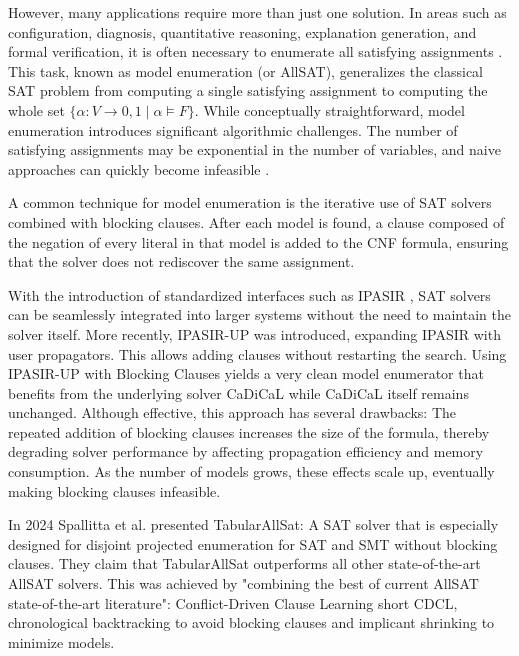 \documentclass[12pt,a4paper]{article}
\begin{document}
However, many applications require more than just one solution. In areas such as configuration, diagnosis, quantitative reasoning, explanation generation, and formal verification, it is often necessary to enumerate all satisfying assignments \cite{7113113} \cite{inproceedings} \cite{biere2021satisfiability} \cite{fried_et_al:LIPIcs.SAT.2023.9}. This task, known as model enumeration (or AllSAT), generalizes the classical SAT problem from computing a single satisfying assignment to computing the whole set \(\{\alpha : V \to {0,1} \mid \alpha \models F\}\). While conceptually straightforward, model enumeration introduces significant algorithmic challenges. The number of satisfying assignments may be exponential in the number of variables, and naive approaches can quickly become infeasible \cite{Spallitta_Sebastiani_Biere_2024}.

A common technique for model enumeration is the iterative use of SAT solvers combined with blocking clauses. After each model is found, a clause composed of the negation of every literal in that model is added to the CNF formula, ensuring that the solver does not rediscover the same assignment.

With the introduction of standardized interfaces such as IPASIR \cite{BALYO201645}, SAT solvers can be seamlessly integrated into larger systems without the need to maintain the solver itself. More recently, IPASIR-UP \cite{fazekas_et_al:LIPIcs.SAT.2023.8} was introduced, expanding IPASIR with user propagators. This allows adding clauses without restarting the search. Using IPASIR-UP with Blocking Clauses yields a very clean model enumerator that benefits from the underlying solver CaDiCaL while CaDiCaL itself remains unchanged. Although effective, this approach has several drawbacks: The repeated addition of blocking clauses increases the size of the formula, thereby degrading solver performance by affecting propagation efficiency and memory consumption. As the number of models grows, these effects scale up, eventually making blocking clauses infeasible.

In 2024 Spallitta et al. \citep{Spallitta_Sebastiani_Biere_2024} presented TabularAllSat: A SAT solver that is especially designed for disjoint projected enumeration for SAT and SMT without blocking clauses. They claim that TabularAllSat outperforms all other state-of-the-art AllSAT solvers. This was achieved by "combining the best of current AllSAT state-of-the-art literature": Conflict-Driven Clause Learning short CDCL, chronological backtracking to avoid blocking clauses and implicant shrinking to minimize models. 
\end{document}
